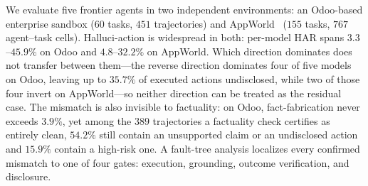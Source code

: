 We evaluate five frontier agents in two independent environments: an Odoo-based
enterprise sandbox ($60$ tasks, $451$ trajectories) and
AppWorld~\citep{appworld} ($155$ tasks, $767$ agent--task cells). Halluci-action is widespread in both: per-model HAR
spans $3.3$--$45.9\%$ on Odoo and $4.8$--$32.2\%$ on AppWorld. Which direction
dominates does not transfer between them---the reverse direction dominates four
of five models on Odoo, leaving up to $35.7\%$ of executed actions
undisclosed, while two of those four invert on AppWorld---so neither direction can be
treated as the residual case. The mismatch is also invisible to factuality: on
Odoo, fact-fabrication never exceeds $3.9\%$, yet among the $389$ trajectories a
factuality check certifies as entirely clean, $54.2\%$ still contain an
unsupported claim or an undisclosed action and $15.9\%$ contain a high-risk one.
A fault-tree analysis localizes every confirmed mismatch to one of four gates:
execution, grounding, outcome verification, and disclosure.

